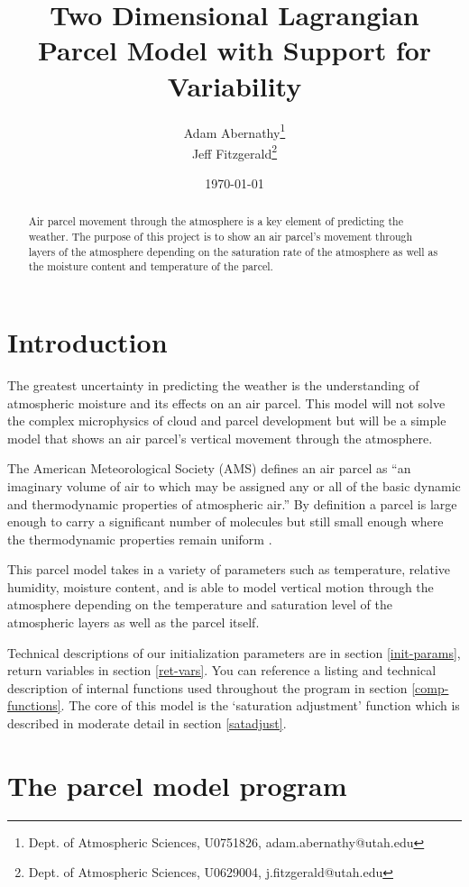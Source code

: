 \documentclass{article}
\title{Two Dimensional Lagrangian Parcel Model with Support for Variability}
\author{Adam Abernathy\footnote{Dept. of Atmospheric Sciences, U0751826, adam.abernathy@utah.edu} \\ Jeff Fitzgerald\footnote{Dept. of Atmospheric Sciences, U0629004, j.fitzgerald@utah.edu}}
\date{\today}
\begin{document}
\maketitle

\begin{abstract}
Air parcel movement through the atmosphere is a key element of predicting the weather. The purpose of this project is to show an air parcel's movement through layers of the atmosphere depending on the saturation rate of the atmosphere as well as the moisture content and temperature of the parcel. 
\end{abstract}


\section{Introduction}

The greatest uncertainty in predicting the weather is the understanding of atmospheric moisture and its effects on an air parcel. This model will not solve the complex microphysics of cloud and parcel development but will be a simple model that shows an air parcel's vertical movement through the atmosphere. 

The American Meteorological Society (AMS) defines an air parcel as ``an imaginary volume of air to which may be assigned any or all of the basic dynamic and thermodynamic properties of atmospheric air.'' By definition a parcel is large enough to carry a significant number of molecules but still small enough where the thermodynamic properties remain uniform \cite{ams-gloss-parcel}.

This parcel model takes in a variety of parameters such as temperature, relative humidity, moisture content, and is able to model vertical motion through the atmosphere depending on the temperature and saturation level of the atmospheric layers as well as the parcel itself.

Technical descriptions of our initialization parameters are in section \ref{init-params}, return variables in section \ref{ret-vars}. You can reference a listing and technical description of internal functions used throughout the program in section \ref{comp-functions}. The core of this model is the `saturation adjustment' function which is described in moderate detail in section \ref{satadjust}.


\newpage
\section{The parcel model program}
\end{document}

